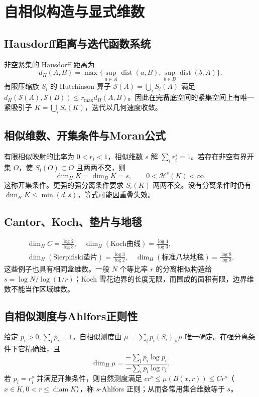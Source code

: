 \documentclass[../main.tex]{subfiles}
\begin{document}
\section{自相似构造与显式维数}
\subsection{Hausdorff距离与迭代函数系统}
非空紧集的 Hausdorff 距离为
\[
d_H(A,B)=\max\{\sup_{a\in A}\operatorname{dist}(a,B),\sup_{b\in B}\operatorname{dist}(b,A)\}.
\]
有限压缩族 $S_i$ 的 Hutchinson 算子 $\mathcal S(A)=\bigcup_iS_i(A)$ 满足 $d_H(\mathcal S(A),\mathcal S(B))\le r_{\max}d_H(A,B)$。因此在完备底空间的紧集空间上有唯一紧吸引子 $K=\bigcup_iS_i(K)$，迭代以几何速度收敛。
\subsection{相似维数、开集条件与Moran公式}
有限相似映射的比率为 $0<r_i<1$，相似维数 $s$ 解 $\sum_ir_i^s=1$。若存在非空有界开集 $O$，使 $S_i(O)\subset O$ 且两两不交，则
\[
\dim_HK=\dim_BK=s,\qquad0<\mathcal H^s(K)<\infty.
\]
这称开集条件。更强的强分离条件要求 $S_i(K)$ 两两不交。没有分离条件时仍有 $\dim_HK\le\min(d,s)$，等式可能因重叠失效。
\subsection{Cantor、Koch、垫片与地毯}
\begin{gather*}
\dim_HC=\frac{\log2}{\log3},\quad
\dim_H(\text{Koch曲线})=\frac{\log4}{\log3},\\
\dim_H(\text{Sierpi\'nski垫片})=\frac{\log3}{\log2},\quad
\dim_H(\text{标准八块地毯})=\frac{\log8}{\log3}.
\end{gather*}
这些例子也具有相同盒维数。一般 $N$ 个等比率 $r$ 的分离相似构造给 $s=\log N/\log(1/r)$；Koch 雪花边界的长度无限，而围成的面积有限，边界维数不能当作区域维数。
\subsection{自相似测度与Ahlfors正则性}
给定 $p_i>0,\sum_ip_i=1$，自相似测度由 $\mu=\sum_ip_i(S_i)_\#\mu$ 唯一确定。在强分离条件下它精确维，且
\[
\dim_H\mu=\frac{-\sum_ip_i\log p_i}{-\sum_ip_i\log r_i}.
\]
若 $p_i=r_i^s$ 并满足开集条件，则自然测度满足 $c r^s\le\mu(B(x,r))\le C r^s$（$x\in K,0<r\le\operatorname{diam}K$），称 $s$-Ahlfors 正则；从而各常用集合维数等于 $s$。
\end{document}
